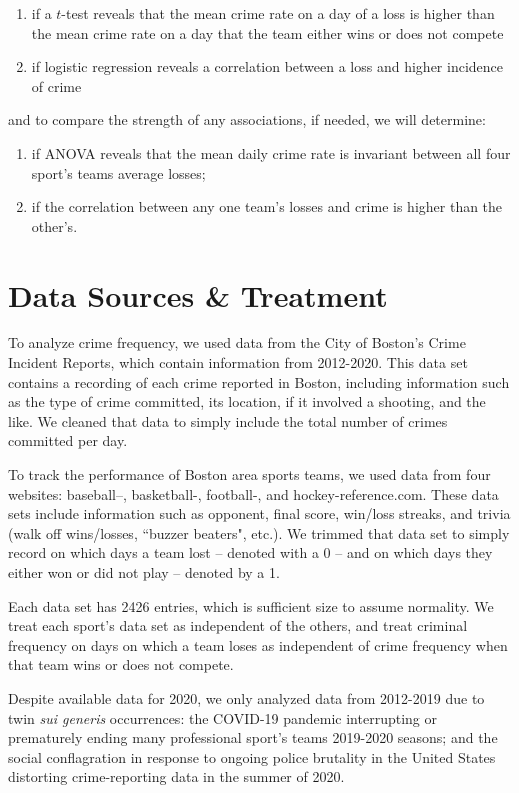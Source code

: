 \documentclass{article}
\begin{document}
\begin{enumerate}
    \item if a $t$-test reveals that the mean crime rate on a day of a loss is higher than the mean crime rate on a day that the team either wins or does not compete
    \item if logistic regression reveals a correlation between a loss and higher incidence of crime
\end{enumerate} and to compare the strength of any associations, if needed, we will determine:
\begin{enumerate}
    \item if ANOVA reveals that the mean daily crime rate is invariant between all four sport's teams average losses;
    \item if the correlation between any one team's losses and crime is higher than the other's.
\end{enumerate}

\section{Data Sources \& Treatment}
To analyze crime frequency, we used data from the City of Boston's Crime Incident Reports, which contain information from 2012-2020. This data set contains a recording of each crime reported in Boston, including information such as the type of crime committed, its location, if it involved a shooting, and the like. We cleaned that data to simply include the total number of crimes committed per day. \newline 

To track the performance of Boston area sports teams, we used data from four websites: baseball--, basketball-, football-, and hockey-reference.com. These data sets include information such as opponent, final score, win/loss streaks, and trivia (walk off wins/losses, ``buzzer beaters", etc.). We trimmed that data set to simply record on which days a team lost -- denoted with a 0 -- and on which days they either won or did not play -- denoted by a 1. \newline

 Each data set has 2426 entries, which is sufficient size to assume normality. We treat each  sport's data set as independent of the others, and treat criminal frequency on days on which a team loses as independent of crime frequency when that team wins or does not compete. \newline

Despite available data for 2020, we only analyzed data from 2012-2019 due to twin \textit{sui generis} occurrences: the COVID-19 pandemic interrupting or prematurely ending many professional sport's teams 2019-2020 seasons; and the social conflagration in response to ongoing police brutality in the United States distorting crime-reporting data in the summer of 2020.
\end{document}
